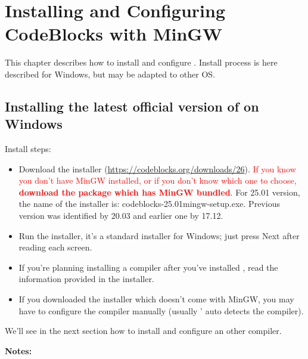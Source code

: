 \chapter{Installing and Configuring CodeBlocks with MinGW}\label{sec:install_codeblocks}

This chapter describes how to install and configure \codeblocks. Install process is here described for Windows, but may be adapted to other OS.

\section{Installing the latest official version of \codeblocks on Windows}
Install steps:
\begin{itemize}
\item Download the \codeblocks installer (\url{https://codeblocks.org/downloads/26}). \textcolor{red}{If you know you don't have MinGW installed, or if you don't know which one to choose, \textbf{download the package which has MinGW bundled}}. For 25.01 version, the name of the installer is: codeblocks-25.01mingw-setup.exe. Previous version was identified by 20.03 and earlier one by 17.12.
\item Run the installer, it's a standard installer for Windows; just press Next after reading each screen.
\item If you're planning installing a compiler after you've installed \codeblocks, read the information provided in the installer.
\item If you downloaded the installer which doesn't come with MinGW, you may have to configure the compiler manually (usually \codeblocks' auto detects the compiler).
\end{itemize}

We'll see in the next section how to install and configure an other compiler.

\textbf{Notes:}

